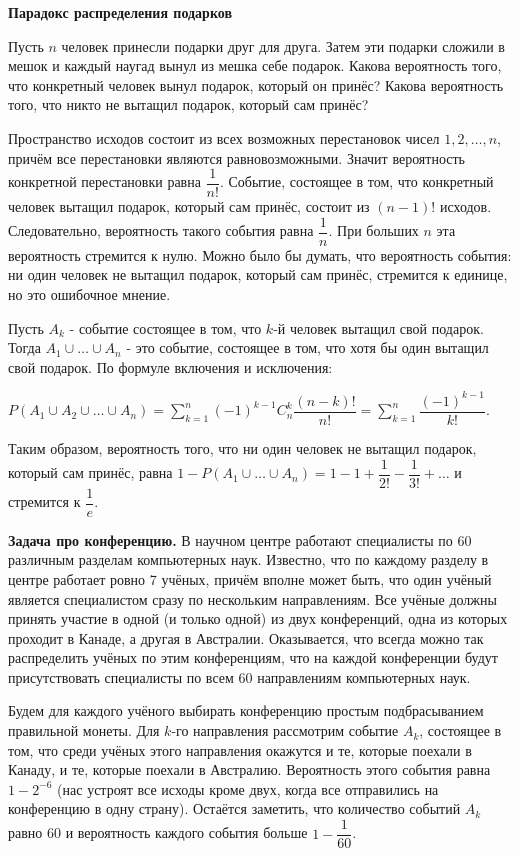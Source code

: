 \documentclass[a4paper]{article}
\begin{document}
\begin{colloq}
   		\textbf{Парадокс распределения подарков}
   		
   		Пусть $n$ человек принесли подарки друг для друга. Затем эти подарки сложили в мешок и каждый наугад вынул из мешка себе подарок. Какова вероятность того, что конкретный человек вынул подарок, который он принёс? Какова вероятность того, что никто не вытащил подарок, который сам принёс?
   		
   		Пространство исходов состоит из всех возможных перестановок чисел $1, 2, \dots , n$, причём все перестановки являются равновозможными. Значит вероятность конкретной перестановки равна $\dfrac{1}{n!}$. Событие, состоящее в том, что конкретный человек вытащил подарок, который сам принёс, состоит из $(n - 1)!$ исходов. Следовательно, вероятность такого
   		события равна $\dfrac{1}{n}$. При больших $n$ эта вероятность стремится к нулю.	Можно было бы думать, что вероятность события: ни один человек не вытащил подарок, который сам принёс, стремится к единице, но это ошибочное мнение.
   		
   		Пусть $A_k$ - событие состоящее в том, что $k$-й человек вытащил свой подарок. Тогда $A_1 \cup \dots \cup A_n$ - это событие, состоящее в том, что хотя бы один вытащил свой подарок. По	формуле включения и исключения: 
   		
   		$P(A_1 \cup A_2 \cup \dots \cup A_n) = \sum_{k = 1}^{n} (-1)^{k - 1} C_n^k \dfrac{(n - k)!}{n!} = \sum_{k = 1}^{n} \dfrac{(-1)^{k-1}}{k!}$.
   		
   		Таким образом, вероятность того, что ни один человек не вытащил подарок, который сам принёс, равна $1 - P(A_1 \cup \dots \cup A_n) = 1 - 1 + \dfrac{1}{2!} - \dfrac{1}{3!} + \dots$ и стремится к $\dfrac{1}{e}$.
   		
   		\textbf{Задача про конференцию.}
   		В научном центре работают специалисты по 60 различным разделам компьютерных наук. Известно, что по каждому разделу в центре работает ровно 7 учёных, причём вполне может быть, что один учёный является специалистом сразу по нескольким направлениям. Все учёные должны принять участие в одной (и только одной) из двух конференций, одна из которых проходит в Канаде, а другая в Австралии. Оказывается, что всегда можно так распределить учёных по этим конференциям, что на каждой конференции будут присутствовать специалисты по всем 60 направлениям компьютерных наук.
   		
   		Будем для каждого учёного выбирать конференцию простым подбрасыванием правильной монеты. Для $k$-го направления рассмотрим событие $A_k$, состоящее в том, что среди учёных этого направления окажутся и те, которые поехали в Канаду, и те, которые поехали в Австралию. Вероятность этого события равна $1-2^{-6}$ (нас устроят все исходы кроме двух, когда все отправились на конференцию в одну страну). Остаётся заметить, что количество событий $A_k$ равно 60 и вероятность каждого события больше $1 - \dfrac{1}{60}$.
   	

\end{colloq}
\end{document}
